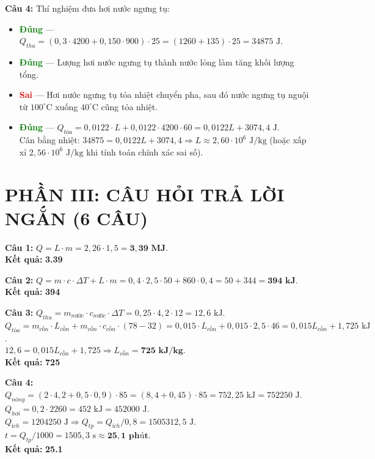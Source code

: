 \documentclass[12pt,a4paper]{article}
\newcommand{\dapan}[1]{\textcolor{green}{\textbf{#1}}}
\newcommand{\dapansai}[1]{\textcolor{red}{\textbf{#1}}}
\begin{document}
\textbf{Câu 4:} Thí nghiệm đưa hơi nước ngưng tụ:
\begin{itemize}
    \item[a.] \dapan{Đúng} — $Q_{thu} = (0{,}3 \cdot 4200 + 0{,}150 \cdot 900) \cdot 25 = (1260 + 135) \cdot 25 = 34875\text{ J}$.
    \item[b.] \dapan{Đúng} — Lượng hơi nước ngưng tụ thành nước lỏng làm tăng khối lượng tổng.
    \item[c.] \dapansai{Sai} — Hơi nước ngưng tụ tỏa nhiệt chuyển pha, sau đó nước ngưng tụ nguội từ $100^{\circ}\text{C}$ xuống $40^{\circ}\text{C}$ cũng tỏa nhiệt.
    \item[d.] \dapan{Đúng} — $Q_{tỏa} = 0{,}0122 \cdot L + 0{,}0122 \cdot 4200 \cdot 60 = 0{,}0122 L + 3074{,}4\text{ J}$.\\
          Cân bằng nhiệt: $34875 = 0{,}0122 L + 3074{,}4 \Rightarrow L \approx 2{,}60 \cdot 10^6\text{ J/kg}$ (hoặc xấp xỉ $2{,}56 \cdot 10^6\text{ J/kg}$ khi tính toán chính xác sai số).
\end{itemize}


\section*{PHẦN III: CÂU HỎI TRẢ LỜI NGẮN (6 CÂU)}

\textbf{Câu 1:} $Q = L \cdot m = 2{,}26 \cdot 1{,}5 = \mathbf{3{,}39\text{ MJ}}$.\\
\textbf{Kết quả:} \textbf{3.39}

\textbf{Câu 2:} $Q = m \cdot c \cdot \Delta T + L \cdot m = 0{,}4 \cdot 2{,}5 \cdot 50 + 860 \cdot 0{,}4 = 50 + 344 = \mathbf{394\text{ kJ}}$.\\
\textbf{Kết quả:} \textbf{394}

\textbf{Câu 3:} $Q_{thu} = m_{nước} \cdot c_{nước} \cdot \Delta T = 0{,}25 \cdot 4{,}2 \cdot 12 = 12{,}6\text{ kJ}$.\\
          $Q_{tỏa} = m_{cồn} \cdot L_{cồn} + m_{cồn} \cdot c_{cồn} \cdot (78 - 32) = 0{,}015 \cdot L_{cồn} + 0{,}015 \cdot 2{,}5 \cdot 46 = 0{,}015 L_{cồn} + 1{,}725\text{ kJ}$.\\
          $12{,}6 = 0{,}015 L_{cồn} + 1{,}725 \Rightarrow L_{cồn} = \mathbf{725\text{ kJ/kg}}$.\\
\textbf{Kết quả:} \textbf{725}

\textbf{Câu 4:} $Q_{nóng} = (2 \cdot 4{,}2 + 0{,}5 \cdot 0{,}9) \cdot 85 = (8{,}4 + 0{,}45) \cdot 85 = 752{,}25\text{ kJ} = 752250\text{ J}$.\\
          $Q_{hơi} = 0{,}2 \cdot 2260 = 452\text{ kJ} = 452000\text{ J}$.\\
          $Q_{ích} = 1204250\text{ J} \Rightarrow Q_{tp} = Q_{ích} / 0{,}8 = 1505312{,}5\text{ J}$.\\
          $t = Q_{tp} / 1000 = 1505{,}3\text{ s} \approx \mathbf{25{,}1\text{ phút}}$.\\
\textbf{Kết quả:} \textbf{25.1}
\end{document}
